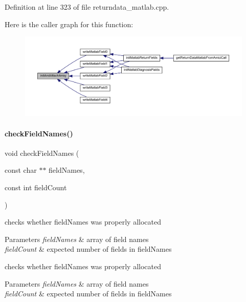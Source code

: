 Definition at line 323 of file returndata\+\_\+matlab.\+cpp.

Here is the caller graph for this function\+:
\nopagebreak
\begin{figure}[H]
\begin{center}
\leavevmode
\includegraphics[width=350pt]{namespaceamici_a10c4b68cefb537f43f52c1f2f23db5f9_icgraph}
\end{center}
\end{figure}
\mbox{\label{namespaceamici_ad34a0a8f0a3d44e86371a2ecb5841c09}} 
\paragraph{\texorpdfstring{check\+Field\+Names()}{checkFieldNames()}}
{\footnotesize\ttfamily void check\+Field\+Names (\begin{DoxyParamCaption}\item[{const char $\ast$$\ast$}]{field\+Names,  }\item[{const int}]{field\+Count }\end{DoxyParamCaption})}

checks whether field\+Names was properly allocated 
\begin{DoxyParams}{Parameters}
{\em field\+Names} & array of field names \\
\hline
{\em field\+Count} & expected number of fields in field\+Names\\
\hline
\end{DoxyParams}
checks whether field\+Names was properly allocated 
\begin{DoxyParams}{Parameters}
{\em field\+Names} & array of field names \\
\hline
{\em field\+Count} & expected number of fields in field\+Names\\
\hline
\end{DoxyParams}


